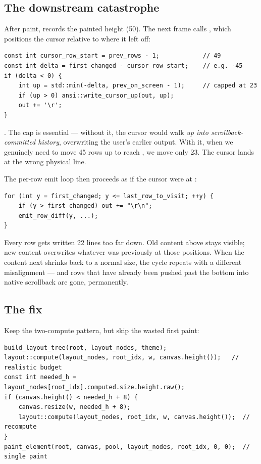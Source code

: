 \subsection{The downstream catastrophe}

After paint,  records the painted
height (50). The next frame calls ,
which positions the cursor relative to where it left off:

\begin{lstlisting}
const int cursor_row_start = prev_rows - 1;            // 49
const int delta = first_changed - cursor_row_start;    // e.g. -45
if (delta < 0) {
    int up = std::min(-delta, prev_on_screen - 1);     // capped at 23
    if (up > 0) ansi::write_cursor_up(out, up);
    out += '\r';
}
\end{lstlisting}

. The
 cap is essential --- without it, the
cursor would walk \emph{up into scrollback-committed history},
overwriting the user's earlier output. With it, when we genuinely
need to move 45 rows up to reach , we move
only 23. The cursor lands at the wrong physical line.

The per-row emit loop then proceeds as if the cursor were at
:

\begin{lstlisting}
for (int y = first_changed; y <= last_row_to_visit; ++y) {
    if (y > first_changed) out += "\r\n";
    emit_row_diff(y, ...);
}
\end{lstlisting}

Every row gets written 22 lines too far down. Old content above
stays visible; new content overwrites whatever was previously at
those positions. When the content next shrinks back to a normal
size, the cycle repeats with a different misalignment --- and rows
that have already been pushed past the bottom into native
scrollback are gone, permanently.

\subsection{The fix}

Keep the two-compute pattern, but skip the wasted first paint:

\begin{lstlisting}
build_layout_tree(root, layout_nodes, theme);
layout::compute(layout_nodes, root_idx, w, canvas.height());   // realistic budget
const int needed_h = layout_nodes[root_idx].computed.size.height.raw();
if (canvas.height() < needed_h + 8) {
    canvas.resize(w, needed_h + 8);
    layout::compute(layout_nodes, root_idx, w, canvas.height());  // recompute
}
paint_element(root, canvas, pool, layout_nodes, root_idx, 0, 0);  // single paint
\end{lstlisting}

